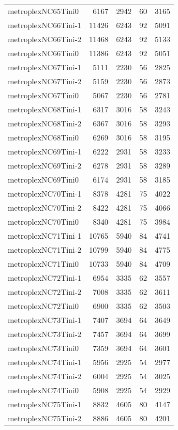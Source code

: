 \documentclass[../../../thesis.tex]{subfiles}
\begin{document}
\begin{longtable}{lrrrr}
metroplexNC65Tini0 & 6167 & 2942 & 60 & 3165 \\
metroplexNC66Tini-1 & 11426 & 6243 & 92 & 5091 \\
metroplexNC66Tini-2 & 11468 & 6243 & 92 & 5133 \\
metroplexNC66Tini0 & 11386 & 6243 & 92 & 5051 \\
metroplexNC67Tini-1 & 5111 & 2230 & 56 & 2825 \\
metroplexNC67Tini-2 & 5159 & 2230 & 56 & 2873 \\
metroplexNC67Tini0 & 5067 & 2230 & 56 & 2781 \\
metroplexNC68Tini-1 & 6317 & 3016 & 58 & 3243 \\
metroplexNC68Tini-2 & 6367 & 3016 & 58 & 3293 \\
metroplexNC68Tini0 & 6269 & 3016 & 58 & 3195 \\
metroplexNC69Tini-1 & 6222 & 2931 & 58 & 3233 \\
metroplexNC69Tini-2 & 6278 & 2931 & 58 & 3289 \\
metroplexNC69Tini0 & 6174 & 2931 & 58 & 3185 \\
metroplexNC70Tini-1 & 8378 & 4281 & 75 & 4022 \\
metroplexNC70Tini-2 & 8422 & 4281 & 75 & 4066 \\
metroplexNC70Tini0 & 8340 & 4281 & 75 & 3984 \\
metroplexNC71Tini-1 & 10765 & 5940 & 84 & 4741 \\
metroplexNC71Tini-2 & 10799 & 5940 & 84 & 4775 \\
metroplexNC71Tini0 & 10733 & 5940 & 84 & 4709 \\
metroplexNC72Tini-1 & 6954 & 3335 & 62 & 3557 \\
metroplexNC72Tini-2 & 7008 & 3335 & 62 & 3611 \\
metroplexNC72Tini0 & 6900 & 3335 & 62 & 3503 \\
metroplexNC73Tini-1 & 7407 & 3694 & 64 & 3649 \\
metroplexNC73Tini-2 & 7457 & 3694 & 64 & 3699 \\
metroplexNC73Tini0 & 7359 & 3694 & 64 & 3601 \\
metroplexNC74Tini-1 & 5956 & 2925 & 54 & 2977 \\
metroplexNC74Tini-2 & 6004 & 2925 & 54 & 3025 \\
metroplexNC74Tini0 & 5908 & 2925 & 54 & 2929 \\
metroplexNC75Tini-1 & 8832 & 4605 & 80 & 4147 \\
metroplexNC75Tini-2 & 8886 & 4605 & 80 & 4201 \\

\end{longtable}
\end{document}
